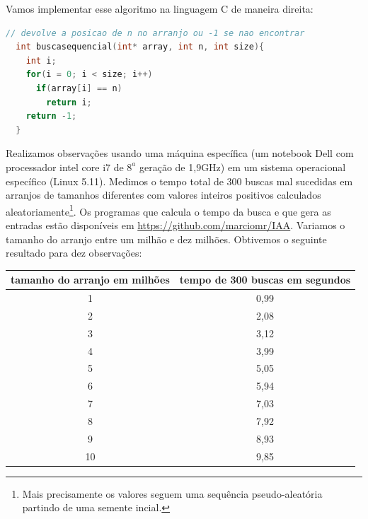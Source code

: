 Vamos implementar esse algoritmo na linguagem C de maneira direita:

\begin{lstlisting}[language=C]
  // devolve a posicao de n no arranjo ou -1 se nao encontrar
  int buscasequencial(int* array, int n, int size){
    int i;
    for(i = 0; i < size; i++)
      if(array[i] == n)
        return i;
    return -1;
  }      
\end{lstlisting}

Realizamos observações usando uma máquina específica (um notebook Dell com processador intel core i7 de $8^a$ geração de 1,9GHz) em um sistema operacional específico (Linux 5.11).
Medimos o tempo total de 300 buscas mal sucedidas em arranjos de tamanhos diferentes com valores inteiros positivos calculados aleatoriamente\footnote{Mais precisamente os valores seguem uma sequência pseudo-aleatória partindo de uma semente incial.}.
Os programas que calcula o tempo da busca e que gera as entradas estão disponíveis em \url{https://github.com/marciomr/IAA}.
Variamos o tamanho do arranjo entre um milhão e dez milhões.
Obtivemos o seguinte resultado para dez observações:

\begin{table}
  \label{tab:observacao}
  \begin{tabular}{|c|c|}
    \hline
    tamanho do arranjo em milhões & tempo de 300 buscas em segundos \\
    \hline 
    1                             & 0,99                            \\
    2                             & 2,08                            \\
    3                             & 3,12                            \\
    4                             & 3,99                            \\
    5                             & 5,05                            \\
    6                             & 5,94                            \\
    7                             & 7,03                            \\
    8                             & 7,92                            \\
    9                             & 8,93                            \\
    10                            & 9,85                            \\
    \hline
  \end{tabular}
\end{table}

